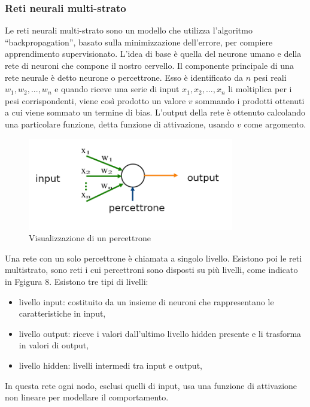 \documentclass[12pt,italian]{report}
\begin{document}
\subsubsection{Reti neurali multi-strato}
Le reti neurali multi-strato sono un modello che utilizza l'algoritmo ``backpropagation'', basato sulla minimizzazione dell'errore, per compiere apprendimento supervisionato. L'idea di base è quella del neurone umano e della rete di neuroni che compone il nostro cervello. Il componente principale di una rete neurale è detto neurone o percettrone. Esso è identificato da $n$ pesi reali $w_1, w_2,...,w_n$ e quando riceve una serie di input $x_1,x_2,...,x_n$ li moltiplica per i pesi corrispondenti, viene così prodotto un valore $v$ sommando i prodotti ottenuti a cui viene sommato un termine di bias. \cite{multilayerPerceptron}  L'output della rete è ottenuto calcolando una particolare funzione, detta funzione di attivazione, usando $v$ come argomento.

\begin{figure}[h]
	\centering
	\includegraphics[width = 90mm]{immagini/Perceptron}
	\caption{Visualizzazione di un percettrone}
\end{figure}


Una rete con un solo percettrone è chiamata a singolo livello. Esistono poi le reti multistrato, sono reti i cui percettroni sono disposti su più livelli, come indicato in Fgigura 8. Esistono tre tipi di livelli: 
\begin{itemize}
	\item livello input: costituito da un insieme di neuroni che rappresentano le caratteristiche in input,
	\item livello output: riceve i valori dall'ultimo livello hidden presente e li trasforma in valori di output, 
	\item livello hidden: livelli intermedi tra input e output, 
\end{itemize}


In questa rete ogni nodo, esclusi quelli di input, usa una funzione di attivazione non lineare per modellare il comportamento.
\end{document}
